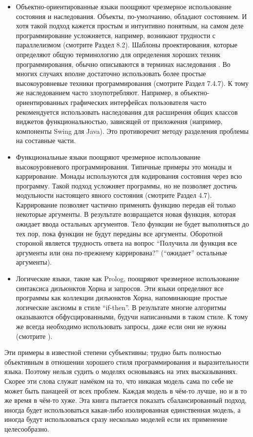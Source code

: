 \begin{itemize}
\item{Объектно-ориентированные языки поощряют чрезмерное использование состояния и наследования. Объекты, по-умолчанию, обладают состоянием. И хотя такой подход кажется простым и интуитивно понятным, на самом деле программирование усложняется, например, возникают трудности с параллелизмом (смотрите Раздел 8.2). Шаблоны проектирования, которые определяют общую терминологию для определения хороших техник программирования, обычно описываются в терминах наследования \cite{58}. Во многих случаях вполне достаточно использовать более простые высокоуровневые техники программирования (смотрите Раздел 7.4.7). К тому же наследованием часто злоупотребляют. Например, в объектно-ориентированных графических интерфейсах пользователя часто рекомендуется использовать наследования для расширения общих классов виджетов функциональностью, зависящей от приложения (например, компоненты Swing для Java). Это противоречит методу разделения проблемы на составные части.}

\item{Функциональные языки поощряют чрезмерное использование высокоуровневого программирования. Типичные примеры это монады и каррирование. Монады используются для кодирования состояния через всю программу. Такой подход усложняет программы, но не позволяет достичь модульности настоящего явного состояния (смотрите Раздел 4.7). Каррирование позволяет частично применять функцию передав ей только некоторые аргументы. В результате возвращается новая функция, которая ожидает ввода остальных аргументов. Тело функции не будет выполняться до тех пор, пока функции не будут переданы все аргументы. Оборотной стороной является трудность ответа на вопрос ``Получила ли функция все аргументы или она по-прежнему каррирована?'' (``ожидает'' остальные аргументы).}

\item{Логические языки, такие как Prolog, поощряют чрезмерное использование синтаксиса дизъюнктов Хорна и запросов. Эти языки определяют все программы как коллекции дизъюнктов Хорна, напоминающие простые логические аксиомы в стиле ``if-then''. В результате многие алгоритмы оказываются обфусцированными, будучи написанными в таком стиле. К тому же всегда необходимо использовать запросы, даже если они не нужны (смотрите \cite{196}).}
\end{itemize}

Эти примеры в известной степени субъективны; трудно быть полностью объективным в отношении хорошего стиля программирования и выразительности языка. Поэтому нельзя судить о моделях основываясь на этих высказываниях. Скорее эти слова служат намёком на то, что никакая модель сама по себе не может быть панацеей от всех проблем. Каждая модель в чём-то лучше, но и в то же время в чём-то хуже. Эта книга пытается показать сбалансированный подход, иногда будет использоваться какая-либо изолированная единственная модель, а иногда будут использоваться сразу несколько моделей если их применение целесообразно.

